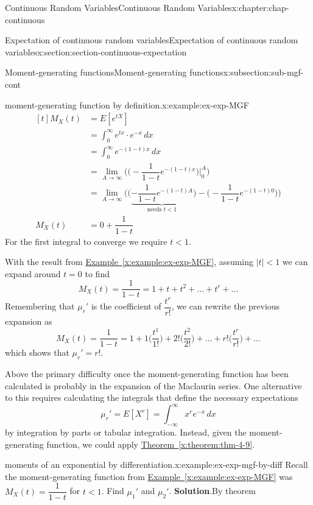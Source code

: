\documentclass[oneside,10pt,]{book}
\newcommand{\blocktitlefont}{\relax}
\newcommand{\xreffont}{\relax}
\numberwithin{equation}{section}
\newcommand{\lt}{<}
\newcommand{\amp}{&}
\begin{document}
\begin{chapterptx}{Continuous Random Variables}{}{Continuous Random Variables}{}{}{x:chapter:chap-continuous}
\begin{sectionptx}{Expectation of continuous random variables}{}{Expectation of continuous random variables}{}{}{x:section:section-continuous-expectation}
\begin{subsectionptx}{Moment-generating functions}{}{Moment-generating functions}{}{}{x:subsection:sub-mgf-cont}
\begin{example}{moment-generating function by definition.}{x:example:ex-exp-MGF}
\begin{equation*}
\begin{aligned}[t]
M_X(t) \amp = E[e^{tX}]\\
\amp = \int_{0}^\infty e^{tx}\cdot e^{-x}\,dx\\
\amp = \int_{0}^\infty e^{-(1-t)x}\,dx\\
\amp =
\lim_{A\to\infty}\Big(\Big(-\dfrac{1}{1-t}e^{-(1-t)x}\Big)\Big|_0^A\Big)
\\
\amp =
\lim_{A\to\infty}\Big(\Big(\underbrace{-\dfrac{1}{1-t}e^{-(1-t)A}}_{\text{needs }t \lt 1}\Big) - \Big(-\dfrac{1}{1-t}e^{-(1-t)0}\Big)\Big)\\
M_X(t) \amp = 0 + \dfrac{1}{1-t}
\end{aligned}
\end{equation*}
For the first integral to converge we require \(t \lt 1\).\end{example}
With the result from \hyperref[x:example:ex-exp-MGF]{Example~{\xreffont\ref{x:example:ex-exp-MGF}}}, assuming \(|t| \lt 1\) we can expand around \(t=0\) to find%
\begin{equation*}
M_X(t) = \dfrac{1}{1-t} = 1
+ t + t^2 + \dots + t^r +
\dots
\end{equation*}
Remembering that \(\mu_r'\) is the coefficient of \(\dfrac{t^r}{r!}\), we can rewrite the previous expansion as%
\begin{equation*}
M_X(t) = \dfrac{1}{1-t} = 1 + 1\Big(\dfrac{t^1}{1!}\Big) +
2!\Big(\dfrac{t^2}{2!}\Big) + \dots + r!\Big(\dfrac{t^r}{r!}\Big) +
\dots
\end{equation*}
which shows that \(\mu_r' = r!\).%
\par
Above the primary difficulty once the moment-generating function has been calculated is probably in the expansion of the Maclaurin series. One alternative to this requires calculating the integrals that define the necessary expectations%
\begin{equation*}
\mu_r' = E[X^r] = \int_{-\infty}^\infty
x^r e^{-x}\,dx
\end{equation*}
by integration by parts or tabular integration. Instead, given the moment-generating function, we could apply \hyperref[x:theorem:thm-4-9]{Theorem~{\xreffont\ref{x:theorem:thm-4-9}}}.%
\begin{example}{moments of an exponential by differentiation.}{x:example:ex-exp-mgf-by-diff}%
Recall the moment-generating function from \hyperref[x:example:ex-exp-MGF]{Example~{\xreffont\ref{x:example:ex-exp-MGF}}} was \(M_X(t) = \dfrac{1}{1-t}\) for \(t \lt 1\). Find \(\mu_1'\) and \(\mu_2'\).%
\textbf{\blocktitlefont Solution}.\quad{}By theorem%

\end{example}
\end{subsectionptx}
\end{sectionptx}
\end{chapterptx}
\end{document}
